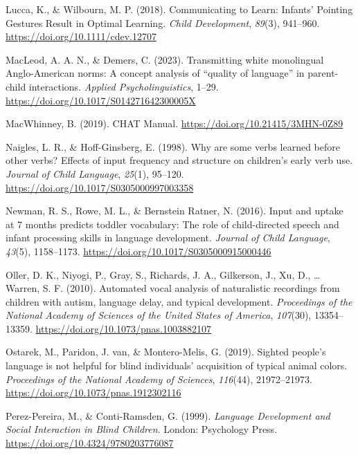 \documentclass[
  man,floatsintext]{apa6}
\newlength{\cslhangindent}
\newlength{\cslentryspacingunit} %
\newenvironment{CSLReferences}[2] %
 {%
  \setlength{\parindent}{0pt}
  \ifodd #1
  \let\oldpar\par
  \def\par{\hangindent=\cslhangindent\oldpar}
  \fi
  \setlength{\parskip}{#2\cslentryspacingunit}
 }%
 {}
\begin{document}
\begin{CSLReferences}{1}{0}
\leavevmode{}%
Lucca, K., \& Wilbourn, M. P. (2018). Communicating to {Learn}: {Infants}' {Pointing Gestures Result} in {Optimal Learning}. \emph{Child Development}, \emph{89}(3), 941--960. \url{https://doi.org/10.1111/cdev.12707}

\leavevmode{}%
MacLeod, A. A. N., \& Demers, C. (2023). Transmitting white monolingual {Anglo-American} norms: {A} concept analysis of {``quality of language''} in parent-child interactions. \emph{Applied Psycholinguistics}, 1--29. \url{https://doi.org/10.1017/S014271642300005X}

\leavevmode{}%
MacWhinney, B. (2019). {CHAT Manual}. \url{https://doi.org/10.21415/3MHN-0Z89}

\leavevmode{}%
Naigles, L. R., \& Hoff-Ginsberg, E. (1998). Why are some verbs learned before other verbs? {Effects} of input frequency and structure on children's early verb use. \emph{Journal of Child Language}, \emph{25}(1), 95--120. \url{https://doi.org/10.1017/S0305000997003358}

\leavevmode{}%
Newman, R. S., Rowe, M. L., \& Bernstein Ratner, N. (2016). Input and uptake at 7 months predicts toddler vocabulary: The role of child-directed speech and infant processing skills in language development. \emph{Journal of Child Language}, \emph{43}(5), 1158--1173. \url{https://doi.org/10.1017/S0305000915000446}

\leavevmode{}%
Oller, D. K., Niyogi, P., Gray, S., Richards, J. A., Gilkerson, J., Xu, D., \ldots{} Warren, S. F. (2010). Automated vocal analysis of naturalistic recordings from children with autism, language delay, and typical development. \emph{Proceedings of the National Academy of Sciences of the United States of America}, \emph{107}(30), 13354--13359. \url{https://doi.org/10.1073/pnas.1003882107}

\leavevmode{}%
Ostarek, M., Paridon, J. van, \& Montero-Melis, G. (2019). Sighted people's language is not helpful for blind individuals' acquisition of typical animal colors. \emph{Proceedings of the National Academy of Sciences}, \emph{116}(44), 21972--21973. \url{https://doi.org/10.1073/pnas.1912302116}

\leavevmode{}%
Perez-Pereira, M., \& Conti-Ramsden, G. (1999). \emph{Language {Development} and {Social Interaction} in {Blind Children}}. {London}: {Psychology Press}. \url{https://doi.org/10.4324/9780203776087}


\end{CSLReferences}
\end{document}
